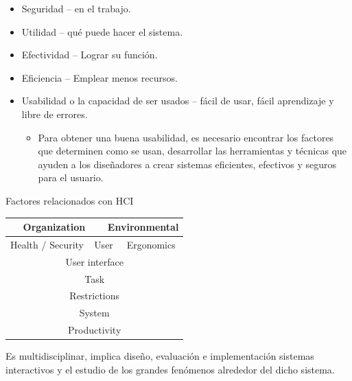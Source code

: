 \documentclass[12pt, twoside, openright]{report} %
\begin{document}
\begin{itemize}
	\item Seguridad -- en el trabajo.
	\item Utilidad -- qué puede hacer el sistema.
	\item Efectividad -- Lograr su función.
	\item Eficiencia -- Emplear menos recursos.
	\item Usabilidad o la capacidad de ser usados -- fácil de usar, fácil
	      aprendizaje y libre de errores.

	      \begin{itemize}
		      \item Para obtener una buena usabilidad, es necesario encontrar los
		            factores que determinen como se usan, desarrollar las
		            herramientas y técnicas que ayuden a los diseñadores a crear
		            sistemas eficientes, efectivos y seguros para el usuario.

	      \end{itemize}
\end{itemize}

Factores relacionados con HCI
\begin{table}[h]
	\begin{tabular}{|c|c|c|c|}
		\hline
		\multicolumn{2}{|c|}{Organization}   & \multicolumn{2}{c|}{Environmental}   \\ \hline
		Health / Security & \multicolumn{2}{c|}{User} & Ergonomics \\ \hline
		\multicolumn{4}{|c|}{User interface}                                        \\ \hline
		\multicolumn{4}{|c|}{Task}                                                  \\ \hline
		\multicolumn{4}{|c|}{Restrictions}                                          \\ \hline
		\multicolumn{4}{|c|}{System}                                                \\ \hline
		\multicolumn{4}{|c|}{Productivity}                                          \\ \hline
	\end{tabular}
\end{table}


Es multidisciplinar, implica diseño, evaluación e implementación
sistemas interactivos y el estudio de los grandes fenómenos
alrededor del dicho sistema.
\end{document}

